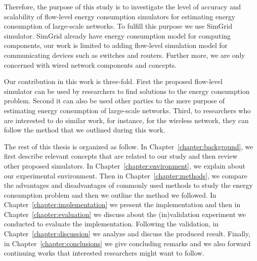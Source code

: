 Therefore, the purpose of this study is to investigate the level of accuracy and scalability of flow-level energy consumption simulators for estimating energy consumption of large-scale networks. To fulfill this purpose we use SimGrid simulator. SimGrid already have energy consumption model for computing components, our work is limited to adding flow-level simulation model for communicating devices such as switches and routers. Further more, we are only concerned with wired network components and concepts. 

Our contribution in this work is three-fold. First the proposed flow-level simulator can be used by researchers to find solutions to the energy consumption problem. Second it can also be used other parties to the mere purpose of estimating energy consumption of large-scale networks. Third, to researchers who are interested to do similar work, for instance, for the wireless network, they can follow the method that we outlined during this work.  

The rest of this thesis is organized as follow. In Chapter~\ref{chapter:background}, we first describe relevant concepts that are related to our study and then review other proposed simulators. In Chapter~\ref{chapter:environment}, we explain about our experimental environment. Then in Chapter~\ref{chapter:methods}, we compare the advantages and disadvantages of commonly used methods to study the energy consumption problem and then we outline the method we followed. In Chapter~\ref{chapter:implementation} we present the implementation and then in Chapter~\ref{chapter:evaluation} we discuss about the (in)validation experiment we conducted to evaluate the implementation. Following the validation, in Chapter~\ref{chapter:discussion} we analyze and discuss the produced result. Finally, in Chapter~\ref{chapter:conclusions} we give concluding remarks and we also forward continuing works that interested researchers might want to follow.


